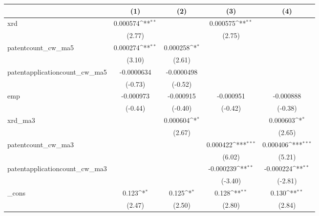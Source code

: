 {
\def\sym#1{\ifmmode^{#1}\else\(^{#1}\)\fi}
\begin{tabular}{l*{4}{c}}
\hline\hline
            &\multicolumn{1}{c}{(1)}         &\multicolumn{1}{c}{(2)}         &\multicolumn{1}{c}{(3)}         &\multicolumn{1}{c}{(4)}         \\
\hline
xrd         &    0.000574\sym{**} &                     &    0.000575\sym{**} &                     \\
            &      (2.77)         &                     &      (2.75)         &                     \\
[1em]
patentcount\_cw\_ma5&    0.000274\sym{**} &    0.000258\sym{*}  &                     &                     \\
            &      (3.10)         &      (2.61)         &                     &                     \\
[1em]
patentapplicationcount\_cw\_ma5&  -0.0000634         &  -0.0000498         &                     &                     \\
            &     (-0.73)         &     (-0.52)         &                     &                     \\
[1em]
emp         &   -0.000973         &   -0.000915         &   -0.000951         &   -0.000888         \\
            &     (-0.44)         &     (-0.40)         &     (-0.42)         &     (-0.38)         \\
[1em]
xrd\_ma3     &                     &    0.000604\sym{*}  &                     &    0.000603\sym{*}  \\
            &                     &      (2.67)         &                     &      (2.65)         \\
[1em]
patentcount\_cw\_ma3&                     &                     &    0.000422\sym{***}&    0.000406\sym{***}\\
            &                     &                     &      (6.02)         &      (5.21)         \\
[1em]
patentapplicationcount\_cw\_ma3&                     &                     &   -0.000239\sym{**} &   -0.000224\sym{**} \\
            &                     &                     &     (-3.40)         &     (-2.81)         \\
[1em]
\_cons      &       0.123\sym{*}  &       0.125\sym{*}  &       0.128\sym{**} &       0.130\sym{**} \\
            &      (2.47)         &      (2.50)         &      (2.80)         &      (2.84)         \\

\end{tabular}}

